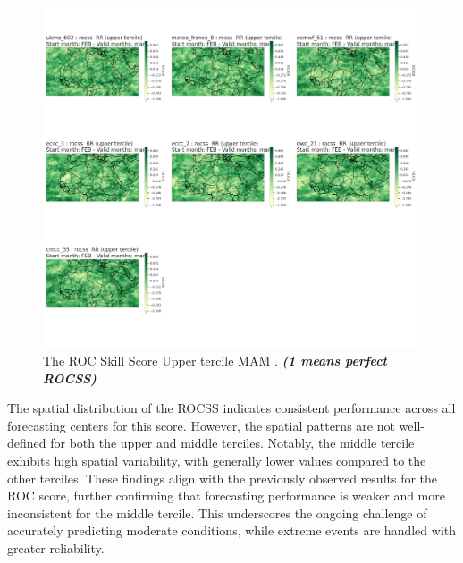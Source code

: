 \begin{figure}[H]
    \centering
    \includegraphics[scale=0.3]{plots/prob/rocss/rocss_mam_RR_upper.png}
    \caption{The ROC Skill Score Upper tercile MAM    . \textbf{\textit{(1 means perfect ROCSS)}}}
\end{figure}


The spatial distribution of the ROCSS indicates consistent performance across all forecasting centers for this score. However, the spatial patterns are not well-defined for both the upper and middle terciles. Notably, the middle tercile exhibits high spatial variability, with generally lower values compared to the other terciles. These findings align with the previously observed results for the ROC score, further confirming that forecasting performance is weaker and more inconsistent for the middle tercile. This underscores the ongoing challenge of accurately predicting moderate conditions, while extreme events are handled with greater reliability.


